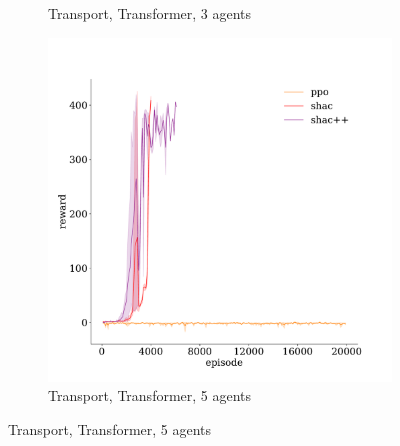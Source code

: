 \begin{figure}[!t]
\begin{subfigure}[b]{0.32\textwidth}
        \caption{Transport, Transformer, 3 agents}
        \label{fig:transport-transformer-3}
    \end{subfigure}
    \begin{subfigure}[b]{0.32\textwidth}
        \includegraphics[width=\textwidth]{figs/transport-5-transformer.pdf}
        \caption{Transport, Transformer, 5 agents}
        \label{fig:transport-transformer-5}
    \end{subfigure}


\end{figure}
